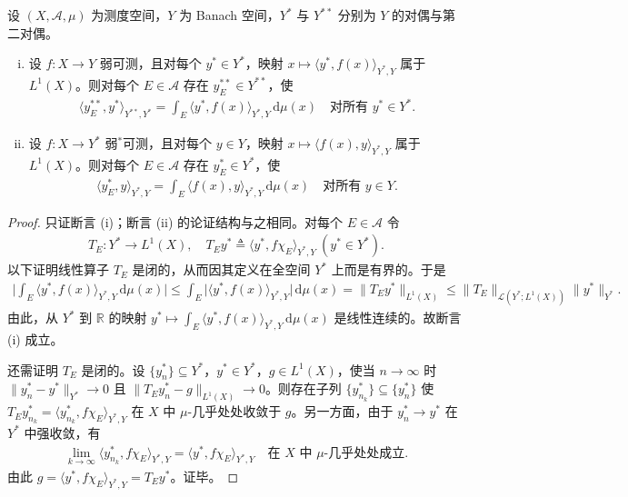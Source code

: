 \documentclass[../../main.tex]{subfiles}%
\begin{document}
\begin{proposition}\label{proposition:ch04-Pettis积分存在}
设 $(X,\mathcal{A},\mu)$ 为测度空间，$Y$ 为 Banach 空间，$Y^*$ 与 $Y^{**}$ 分别为 $Y$ 的对偶与第二对偶。
\begin{enumerate}[(i)]
\item\label{item:ch04-Pettis积分存在-i} 设 $f:X\to Y$ 弱可测，且对每个 $y^*\in Y^*$，映射 $x\mapsto\langle y^*,f(x)\rangle_{Y^*,Y}$ 属于 $L^1(X)$。则对每个 $E\in\mathcal{A}$ 存在 $y_E^{**}\in Y^{**}$，使
\begin{align}
\langle y_E^{**},y^*\rangle_{Y^{**},Y^*}=\int_E\langle y^*,f(x)\rangle_{Y^*,Y}\,\mathrm{d}\mu(x)\quad\text{对所有 }y^*\in Y^*. \label{align:ch04-4.61}
\end{align}
\item\label{item:ch04-Pettis积分存在-ii} 设 $f:X\to Y^*$ 弱$^*$可测，且对每个 $y\in Y$，映射 $x\mapsto\langle f(x),y\rangle_{Y^*,Y}$ 属于 $L^1(X)$。则对每个 $E\in\mathcal{A}$ 存在 $y_E^*\in Y^*$，使
\begin{align}
\langle y_E^*,y\rangle_{Y^*,Y}=\int_E\langle f(x),y\rangle_{Y^*,Y}\,\mathrm{d}\mu(x)\quad\text{对所有 }y\in Y. \label{align:ch04-4.62}
\end{align}
\end{enumerate}
\end{proposition}

\begin{proof}
只证断言 (i)；断言 (ii) 的论证结构与之相同。对每个 $E\in\mathcal{A}$ 令
\begin{align*}
T_E:Y^*\to L^1(X),\quad T_Ey^*\triangleq \langle y^*,f\chi_E\rangle_{Y^*,Y}\ (y^*\in Y^*).
\end{align*}
以下证明线性算子 $T_E$ 是闭的，从而因其定义在全空间 $Y^*$ 上而是有界的。于是
\begin{align*}
\Big|\int_E\langle y^*,f(x)\rangle_{Y^*,Y}\,\mathrm{d}\mu(x)\Big|
\leqslant\int_E\big|\langle y^*,f(x)\rangle_{Y^*,Y}\big|\,\mathrm{d}\mu(x)
=\|T_Ey^*\|_{L^1(X)}
\leqslant\|T_E\|_{\mathcal{L}(Y^*;L^1(X))}\|y^*\|_{Y^*}.
\end{align*}
由此，从 $Y^*$ 到 $\mathbb{R}$ 的映射 $y^*\mapsto\int_E\langle y^*,f(x)\rangle_{Y^*,Y}\,\mathrm{d}\mu(x)$ 是线性连续的。故断言 (i) 成立。

还需证明 $T_E$ 是闭的。设 $\{y_n^*\}\subseteq Y^*$，$y^*\in Y^*$，$g\in L^1(X)$，使当 $n\to\infty$ 时 $\|y_n^*-y^*\|_{Y^*}\to0$ 且 $\|T_Ey_n^*-g\|_{L^1(X)}\to0$。则存在子列 $\{y_{n_k}^*\}\subseteq\{y_n^*\}$ 使 $T_Ey_{n_k}^*=\langle y_{n_k}^*,f\chi_E\rangle_{Y^*,Y}$ 在 $X$ 中 $\mu$-几乎处处收敛于 $g$。另一方面，由于 $y_n^*\to y^*$ 在 $Y^*$ 中强收敛，有
\begin{align*}
\lim_{k\to\infty}\langle y_{n_k}^*,f\chi_E\rangle_{Y^*,Y}=\langle y^*,f\chi_E\rangle_{Y^*,Y}\quad\text{在 }X\text{ 中 }\mu\text{-几乎处处成立}.
\end{align*}
由此 $g=\langle y^*,f\chi_E\rangle_{Y^*,Y}=T_Ey^*$。证毕。
\end{proof}
\end{document}
